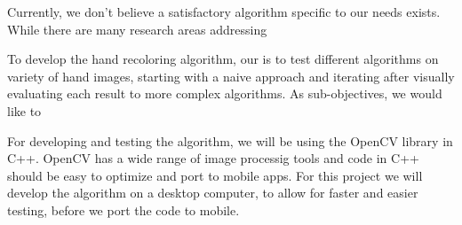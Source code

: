\documentclass[12pt, a4paper]{article}
\begin{document}
Currently, we don't believe a satisfactory algorithm specific to our needs exists. While there are many research areas addressing

To develop the hand recoloring algorithm, our is to test different algorithms on variety of hand images, starting with a naive approach and iterating after visually evaluating each result to more complex algorithms. As sub-objectives, we would like to 

For developing and testing the algorithm, we will be using the OpenCV library in C++. OpenCV has a wide range of image processig tools and code in C++ should be easy to optimize and port to mobile apps. For this project we will develop the algorithm on a desktop computer, to allow for faster and easier testing, before we port the code to mobile.








\pagebreak



\pagebreak
\end{document}
